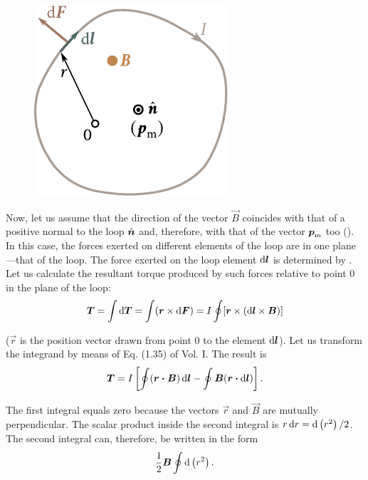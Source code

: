 \begin{figure}[t]
	\begin{center}
		\includegraphics[scale=1]{figures/ch_06/fig_6_15.pdf}
		\caption[]{}
		\label{fig:6_15}
	\end{center}
	\vspace{-0.8cm}
\end{figure}

Now, let us assume that the direction of the vector $\vec{B}$ coincides with that of a positive normal to the loop $\hat{\boldsymbol{n}}$ and, therefore, with that of the vector $\boldsymbol{p}_{\text{m}}$ too (). In this case, the forces exerted on different elements of the loop are in one plane---that of the loop. The force exerted on the loop element $\mathrm{d}\boldsymbol{l}$ is determined by . Let us calculate the resultant torque produced by such forces relative to point $0$ in the plane of the loop:
\begin{equation*}
    \boldsymbol{T} = \int \mathrm{d}\boldsymbol{T} = \int (\boldsymbol{r} \times \mathrm{d}\boldsymbol{F}) = I \oint [\boldsymbol{r} \times (\mathrm{d}\boldsymbol{l} \times \boldsymbol{B})]
\end{equation*}

\noindent
($\vec{r}$ is the position vector drawn from point $0$ to the element $\mathrm{d}\boldsymbol{l}$). Let us transform the integrand by means of Eq. (1.35) of Vol. I. The result is
\begin{equation*}
    \boldsymbol{T} = I \left[ \oint (\boldsymbol{r\cdot B})\, \mathrm{d}\boldsymbol{l} - \oint \boldsymbol{B} (\boldsymbol{r} \boldsymbol{\cdot} \mathrm{d}\boldsymbol{l}) \right].
\end{equation*}

The first integral equals zero because the vectors $\vec{r}$ and $\vec{B}$ are mutually perpendicular. The scalar product inside the second integral is $r\,\mathrm{d} r = \mathrm{d}\left(r^2\right)/2$. The second integral can, therefore, be written in the form
\begin{equation*}
    \frac{1}{2} \boldsymbol{B} \oint \mathrm{d}\left(r^2\right).
\end{equation*}

